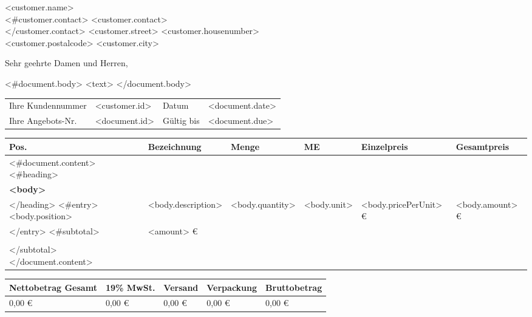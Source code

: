 \documentclass[DIN, pagenumber=footmiddle, parskip=half,
fromalign=right,  %
fromphone=true, fromfax=false,
fromrule=false]{scrlttr2}
\begin{document}
\begin{letter}{
<customer.name>\\
<#customer.contact>
<customer.contact>\\
</customer.contact>
<customer.street> <customer.housenumber>\\
<customer.postalcode> <customer.city>
}

\opening{Sehr geehrte Damen und Herren,}
<#document.body>
<text>
\newline
</document.body>

\newpage

\begin{longtable}{p{4cm}p{5.5cm}p{2cm}p{4cm}}
Ihre Kundennummer & <customer.id> & Datum & <document.date>\\
Ihre Angebots-Nr. & <document.id> & Gültig bis & <document.due>\\
\end{longtable}

\begin{longtable}{p{0.5cm}p{5.5cm}p{1cm}p{1cm}p{2.5cm}p{2.5cm}}
\hline
Pos. & Bezeichnung & Menge & ME & Einzelpreis & Gesamtpreis\\
\hline
<#document.content>
  <#heading>
    \\
    \multicolumn{6}{l}{\textbf{<body>}}\\
  </heading>
  <#entry>
    <body.position> & <body.description> & <body.quantity> & <body.unit> & <body.pricePerUnit> \euro{} & <body.amount> \euro{}\\
  </entry>
  <#subtotal>
    \multicolumn{5}{r}{<body>} & <amount> \euro{}\\
    \\
  </subtotal>
</document.content>
\hline
\hline 
\end{longtable}

\begin{longtable}{p{5.5cm}p{2.5cm}p{2.5cm}p{2cm}p{3cm}}
\hline Nettobetrag Gesamt & 19\% MwSt. & Versand & Verpackung & Bruttobetrag\\
\hline 
0,00 \euro{} & 0,00 \euro & 0,00 \euro & 0,00 \euro & 0,00 \euro{}\\
\hline\hline 	
\end{longtable}

\end{letter}
\end{document}
